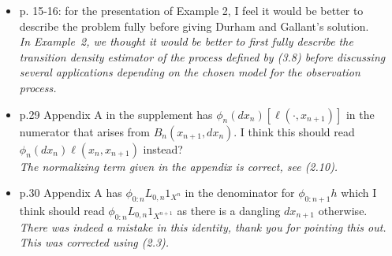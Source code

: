 \documentclass[12pt]{amsart}
\begin{document}
\begin{itemize}
\item p. 15-16: for the presentation of Example 2, I feel it would be better to describe the problem fully before giving Durham and Gallant's solution.\\
{\em In Example~2, we thought it would be better to first fully describe the transition density estimator of the process defined by (3.8) before discussing several applications depending on the chosen model for the observation process.}
\item p.29 Appendix A in the supplement has $\phi_n(dx_n)[\ell(\cdot,x_{n+1})]$  in the numerator that arises from $B_n(x_{n+1},dx_n)$. I think this should read $\phi_n(dx_n)\ell(x_n,x_{n+1})$  instead?\\
{\em The normalizing term given in the appendix is correct, see (2.10).}
\item p.30 Appendix A has $\phi_{0:n}L_{0,n}1_{X^n}$  in the denominator for  $\phi_{0:n+1}h$ which I think should read  $\phi_{0:n}L_{0,n}1_{X^{n+1}}$ as there is a dangling $dx_{n+1}$ otherwise.\\
{\em There was indeed a mistake in this identity, thank you for pointing this out. This was corrected using (2.3).}
\end{itemize}
\end{document}
